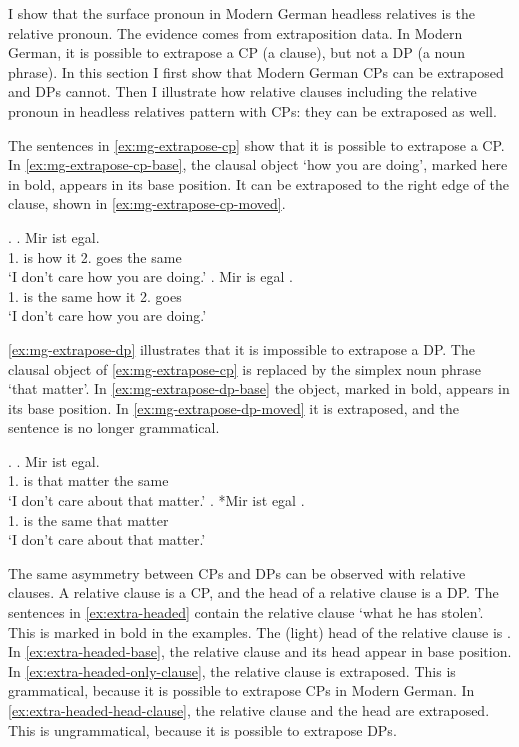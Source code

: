 I show that the surface pronoun in Modern German headless relatives is the relative pronoun.
The evidence comes from extraposition data. In Modern German, it is possible to extrapose a CP (a clause), but not a DP (a noun phrase). In this section I first show that Modern German CPs can be extraposed and DPs cannot. Then I illustrate how relative clauses including the relative pronoun in headless relatives pattern with CPs: they can be extraposed as well.

The sentences in \ref{ex:mg-extrapose-cp} show that it is possible to extrapose a CP. In \ref{ex:mg-extrapose-cp-base}, the clausal object  `how you are doing', marked here in bold, appears in its base position. It can be extraposed to the right edge of the clause, shown in \ref{ex:mg-extrapose-cp-moved}.

\ex.\label{ex:mg-extrapose-cp}
\ag. Mir ist     egal.\\
1. is how it 2. goes {the same}\\
`I don't care how you are doing.'\label{ex:mg-extrapose-cp-base}
\bg. Mir is egal    .\\
1. is {the same} how it 2. goes\\
`I don't care how you are doing.' \label{ex:mg-extrapose-cp-moved}

\ref{ex:mg-extrapose-dp} illustrates that it is impossible to extrapose a DP. The clausal object of \ref{ex:mg-extrapose-cp} is replaced by the simplex noun phrase  `that matter'.
In \ref{ex:mg-extrapose-dp-base} the object, marked in bold, appears in its base position. In \ref{ex:mg-extrapose-dp-moved} it is extraposed, and the sentence is no longer grammatical.

\ex.\label{ex:mg-extrapose-dp}
\ag. Mir ist   egal.\\
1. is that matter {the same}\\
`I don't care about that matter.'\label{ex:mg-extrapose-dp-base}
\bg. *Mir ist egal  .\\
1. is {the same} that matter\\
`I don't care about that matter.' \label{ex:mg-extrapose-dp-moved}

The same asymmetry between CPs and DPs can be observed with relative clauses. A relative clause is a CP, and the head of a relative clause is a DP. The sentences in \ref{ex:extra-headed} contain the relative clause  `what he has stolen'. This is marked in bold in the examples. The (light) head of the relative clause is .
In \ref{ex:extra-headed-base}, the relative clause and its head appear in base position. In \ref{ex:extra-headed-only-clause}, the relative clause is extraposed. This is grammatical, because it is possible to extrapose CPs in Modern German. In \ref{ex:extra-headed-head-clause}, the relative clause and the head are extraposed. This is ungrammatical, because it is possible to extrapose DPs.

